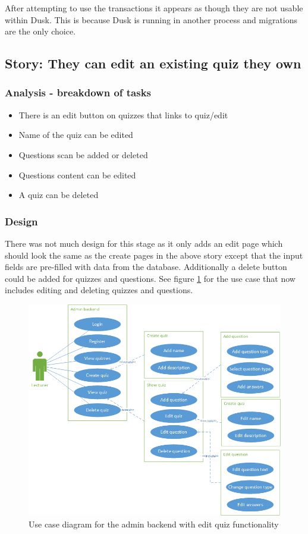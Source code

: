 After attempting to use the transactions it appears as though they are not usable within Dusk. This is because Dusk is running in another process and migrations are the only choice\cite{dusk-transactions}. 
\newpage

\subsection{Story: They can edit an existing quiz they own}
\subsubsection{Analysis - breakdown of tasks}
\begin{itemize}
	\item There is an edit button on quizzes that links to quiz/edit
	\item Name of the quiz can be edited
	\item Questions scan be added or deleted
	\item Questions content can be edited
	\item A quiz can be deleted
\end{itemize}
\subsubsection{Design}
There was not much design for this stage as it only adds an edit page which should look the same as the create pages in the above story except that the input fields are pre-filled with data from the database. Additionally a delete button could be added for quizzes and questions. See figure \ref{fig:quiz-edit-use-case} for the use case that now includes editing and deleting quizzes and questions.
\begin{figure}
	\caption{Use case diagram for the admin backend with edit quiz functionality}
	\centerline{\includegraphics{Chapter2/Iter-2/iter-2-use-case-edit}}
	\label{fig:quiz-edit-use-case}
\end{figure}
